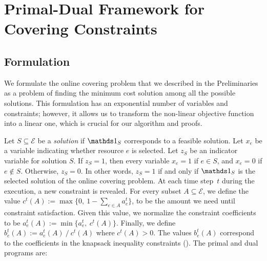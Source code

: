 
\section{Primal-Dual Framework for Covering Constraints}		\label{sec:covering}

\subsection{Formulation}
We formulate the online covering problem that we described in the Preliminaries as a problem of finding the minimum cost solution among all the possible solutions. This formulation has an exponential number of variables and constraints; however, it allows us to transform the non-linear objective function into a linear one, which is crucial for our algorithm and proofs.

Let $S \subseteq \mathcal{E}$ be a \emph{solution} if $\one_{S}$ corresponds to a feasible solution. Let $x_{e}$ be a variable indicating whether resource $e$ is selected.
Let $z_{S}$ be an indicator variable for solution $S$. If $z_{S} = 1$, then every variable
$x_{e} = 1$ if $e \in S$, and $x_{e} = 0$ if $e \notin S$. Otherwise, $z_S = 0$. In other words, $z_{S} = 1$ if and only if $\one_{S}$ is the selected solution of the online covering problem. At each time step~$t$ during the execution, a new constraint is revealed. For every subset $A \subseteq \mathcal{E}$, we define the value $c^{t}(A) := \max\{0,\ 1 - \sum_{e \in A} a^{t}_{e}\}$, to be the amount we need until constraint satisfaction. Given this value, we normalize the constraint coefficients to be $a^{t}_{e}(A) := \min\{a_{e}^{t},\ c^{t}(A)\}$. Finally, we define $b^{t}_{e}(A) := a^{t}_{e}(A)\ /\ c^{t}(A)$ where $c^{t}(A) > 0$. The values $b^{t}_{e}(A)$ correspond to the coefficients in the knapsack inequality constraints (\cite{CarrFleischer:2000}). The primal and dual programs are:

